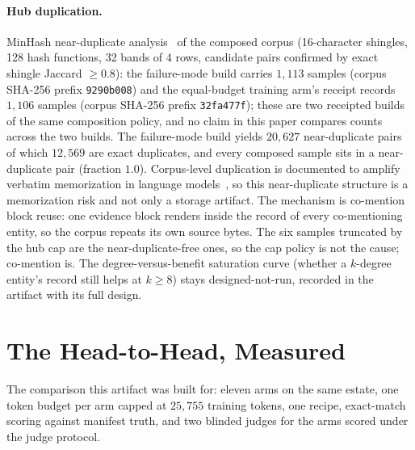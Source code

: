 \documentclass{article}
\begin{document}
\paragraph{Hub duplication.}
MinHash near-duplicate analysis~\cite{broder1997resemblance} of the composed corpus (16-character shingles, 128 hash functions, 32 bands of 4 rows, candidate pairs confirmed by exact shingle Jaccard $\geq 0.8$): the failure-mode build carries $1{,}113$ samples (corpus SHA-256 prefix \texttt{9290b008}) and the equal-budget training arm's receipt records $1{,}106$ samples (corpus SHA-256 prefix \texttt{32fa477f}); these are two receipted builds of the same composition policy, and no claim in this paper compares counts across the two builds. The failure-mode build yields $20{,}627$ near-duplicate pairs of which $12{,}569$ are exact duplicates, and every composed sample sits in a near-duplicate pair (fraction $1.0$). Corpus-level duplication is documented to amplify verbatim memorization in language models~\cite{lee2022dedup}, so this near-duplicate structure is a memorization risk and not only a storage artifact. The mechanism is co-mention block reuse: one evidence block renders inside the record of every co-mentioning entity, so the corpus repeats its own source bytes. The six samples truncated by the hub cap are the near-duplicate-free ones, so the cap policy is not the cause; co-mention is. The degree-versus-benefit saturation curve (whether a $k$-degree entity's record still helps at $k \geq 8$) stays designed-not-run, recorded in the artifact with its full design.

\section{The Head-to-Head, Measured}
\label{sec:headtohead}

The comparison this artifact was built for: eleven arms on the same estate, one token budget per arm capped at $25{,}755$ training tokens, one recipe, exact-match scoring against manifest truth, and two blinded judges for the arms scored under the judge protocol.
\end{document}
